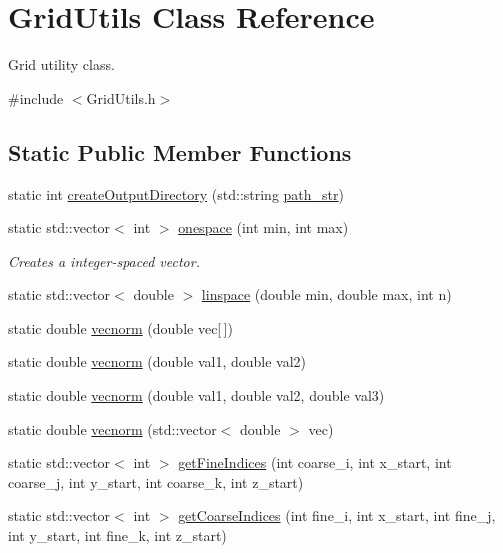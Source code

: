 \hypertarget{class_grid_utils}{}\section{Grid\+Utils Class Reference}
\label{class_grid_utils}


Grid utility class.  




{\ttfamily \#include $<$Grid\+Utils.\+h$>$}

\subsection*{Static Public Member Functions}
\begin{DoxyCompactItemize}
\item 
static int \hyperlink{class_grid_utils_ae2c829e8787d4aa03ec961dc84213b0d}{create\+Output\+Directory} (std\+::string \hyperlink{class_grid_utils_a9b58748e9e05e84852962d7abc7942e3}{path\+\_\+str})
\item 
static std\+::vector$<$ int $>$ \hyperlink{class_grid_utils_a1f0d4a76be76a743c368c9a1d4d46cbc}{onespace} (int min, int max)
\begin{DoxyCompactList}\small\item\em Creates a integer-\/spaced vector. \end{DoxyCompactList}\item 
static std\+::vector$<$ double $>$ \hyperlink{class_grid_utils_a2f172a6dd8b2749ca1c8336a64a07e29}{linspace} (double min, double max, int n)
\item 
static double \hyperlink{class_grid_utils_ab51d52eb381ac0b27e3522e101922428}{vecnorm} (double vec\mbox{[}$\,$\mbox{]})
\item 
static double \hyperlink{class_grid_utils_ae7d797edf50b3c3a448d59684a135aee}{vecnorm} (double val1, double val2)
\item 
static double \hyperlink{class_grid_utils_a6caced99b15b01746c1fb5828c447034}{vecnorm} (double val1, double val2, double val3)
\item 
static double \hyperlink{class_grid_utils_a45167f9bde2e34d868a4ccc64f588ab2}{vecnorm} (std\+::vector$<$ double $>$ vec)
\item 
static std\+::vector$<$ int $>$ \hyperlink{class_grid_utils_aee47fe58eccee5fffd67bb489fd1c315}{get\+Fine\+Indices} (int coarse\+\_\+i, int x\+\_\+start, int coarse\+\_\+j, int y\+\_\+start, int coarse\+\_\+k, int z\+\_\+start)
\item 
static std\+::vector$<$ int $>$ \hyperlink{class_grid_utils_a4d3973d2b60fe6cac6e49e8640307958}{get\+Coarse\+Indices} (int fine\+\_\+i, int x\+\_\+start, int fine\+\_\+j, int y\+\_\+start, int fine\+\_\+k, int z\+\_\+start)

\end{DoxyCompactItemize}
